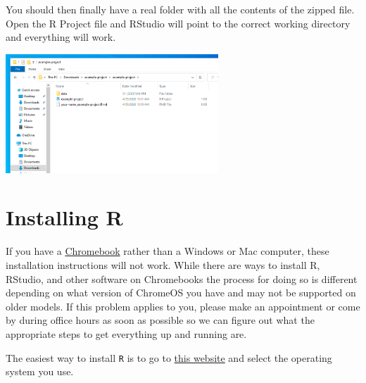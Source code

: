 \documentclass[
  letterpaper,
  DIV=11,
  numbers=noendperiod,
  oneside]{scrreprt}
\begin{document}
You should then finally have a real folder with all the contents of the
zipped file. Open the R Project file and RStudio will point to the
correct working directory and everything will work.

\includegraphics[width=0.6\textwidth,height=\textheight]{pics/extract-windows-3.png}


\hypertarget{installing-r}{%
\chapter{Installing R}\label{installing-r}}

\begin{tcolorbox}[enhanced jigsaw, breakable, opacitybacktitle=0.6, colframe=quarto-callout-important-color-frame, bottomrule=.15mm, opacityback=0, toprule=.15mm, coltitle=black, toptitle=1mm, colback=white, titlerule=0mm, bottomtitle=1mm, colbacktitle=quarto-callout-important-color!10!white, title=\textcolor{quarto-callout-important-color}{\faExclamation}\hspace{0.5em}{Important Note Regarding Chromebooks}, rightrule=.15mm, arc=.35mm, leftrule=.75mm, left=2mm]

If you have a
\href{https://en.wikipedia.org/wiki/Chromebook}{Chromebook} rather than
a Windows or Mac computer, these installation instructions will not
work. While there are ways to install R, RStudio, and other software on
Chromebooks the process for doing so is different depending on what
version of ChromeOS you have and may not be supported on older models.
If this problem applies to you, please make an appointment or come by
during office hours as soon as possible so we can figure out what the
appropriate steps to get everything up and running are.

\end{tcolorbox}

The easiest way to install \texttt{R} is to go to
\href{https://cran.rstudio.com/}{this website} and select the operating
system you use.
\end{document}
